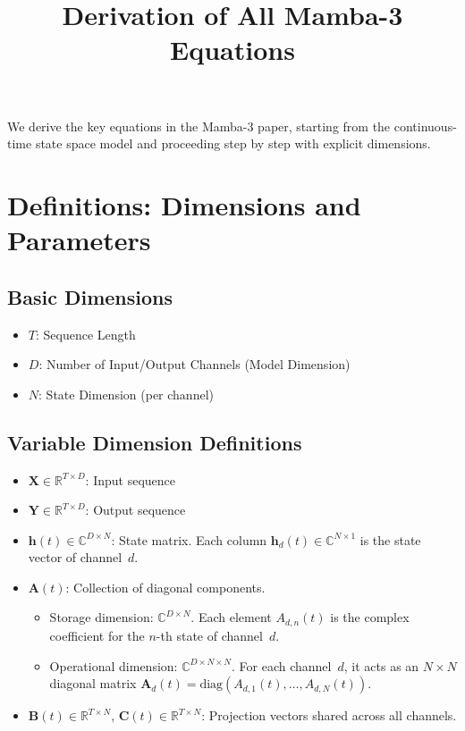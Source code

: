 \documentclass[11pt,a4paper]{article}
\title{Derivation of All Mamba-3 Equations}
\author{}
\date{}
\begin{document}
\maketitle

We derive the key equations in the Mamba-3 paper, starting from the continuous-time state space model and proceeding step by step with explicit dimensions.

\section{Definitions: Dimensions and Parameters}

\subsection{Basic Dimensions}

\begin{itemize}
  \item $T$: Sequence Length
  \item $D$: Number of Input/Output Channels (Model Dimension)
  \item $N$: State Dimension (per channel)
\end{itemize}

\subsection{Variable Dimension Definitions}

\begin{itemize}
  \item $\mathbf{X} \in \mathbb{R}^{T \times D}$: Input sequence
  \item $\mathbf{Y} \in \mathbb{R}^{T \times D}$: Output sequence
  \item $\mathbf{h}(t) \in \mathbb{C}^{D \times N}$: State matrix. Each column $\mathbf{h}_d(t) \in \mathbb{C}^{N \times 1}$ is the state vector of channel~$d$.
  \item $\mathbf{A}(t)$: Collection of diagonal components.
    \begin{itemize}
      \item Storage dimension: $\mathbb{C}^{D \times N}$. Each element $A_{d,n}(t)$ is the complex coefficient for the $n$-th state of channel~$d$.
      \item Operational dimension: $\mathbb{C}^{D \times N \times N}$. For each channel~$d$, it acts as an $N \times N$ diagonal matrix $\mathbf{A}_d(t) = \mathrm{diag}(A_{d,1}(t), \dots, A_{d,N}(t))$.
    \end{itemize}
  \item $\mathbf{B}(t) \in \mathbb{R}^{T \times N}$, $\mathbf{C}(t) \in \mathbb{R}^{T \times N}$: Projection vectors shared across all channels.
\end{itemize}
\end{document}
